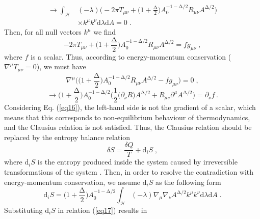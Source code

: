 \documentclass[11pt,twocolumn]{article}
\begin{document}
    \begin{align}
    \to \int_{\mathcal{H}}^{}& (-\lambda) \Bigg(-2\pi T_{\mu \nu}+\Big(1+\frac{\mathrm{\Delta}}{2}\Big) A_0^{-1-\mathrm{\Delta}/2} R_{\mu \nu} A^{\mathrm{\Delta}/2} \Bigg) \nonumber \\
    & \times k^{\mu} k^{\nu} \mathrm{d}\lambda \mathrm{d}A=0 \;. \label{eq13}
    \end{align}
    Then, for all null vectors $k^{\mu}$ we find
    \begin{equation} \label{eq14}
    -2\pi T_{\mu \nu}+\Big(1+\frac{\mathrm{\Delta}}{2}\Big) A_0^{-1-\mathrm{\Delta}/2} R_{\mu \nu} A^{\mathrm{\Delta}/2}=f g_{\mu \nu} \;,
    \end{equation}
where $f$ is a scalar. Thus, according to energy-momentum
conservation ($\nabla^{\mu} T_{\mu \nu}=0$), we must have
    \begin{equation} \label{eq15}
    \nabla^{\mu} \Bigg(\Big(1+\frac{\mathrm{\Delta}}{2}\Big) A_0^{-1-\mathrm{\Delta}/2} R_{\mu \nu} A^{\mathrm{\Delta}/2}-f g_{\mu \nu}\Bigg)=0 \;,
    \end{equation}
    \begin{equation} \label{eq16}
    \to \Big(1+\frac{\mathrm{\Delta}}{2}\Big) A_0^{-1-\mathrm{\Delta}/2} \Bigg(\frac{1}{2}\big(\partial_{\nu} R\big) A^{\mathrm{\Delta}/2} + R_{\mu \nu} \partial^{\mu} A^{\mathrm{\Delta}/2}\Bigg) =\partial_{\nu} f \,.
    \end{equation}
Considering Eq. (\ref{eq16}), the left-hand side is not the gradient of a
scalar, which means that this corresponds to non-equilibrium behaviour
of thermodynamics, and the Clausius relation is not satisfied. Thus,
the Clausius relation should be replaced by the entropy balance
relation \cite{grth3}
    \begin{equation} \label{eq17}
    \delta S=\frac{\delta Q}{T}+\mathrm{d}_i S \;,
    \end{equation}
where $\mathrm{d}_i S$ is the entropy produced inside the system
caused by irreversible transformations of the system \cite{en1}. Then, in order to resolve
the contradiction with energy-momentum conservation, we assume
$\mathrm{d}_i S$ as the following form
    \begin{equation} \label{eq18}
    \mathrm{d}_i S=\Big(1+\frac{\mathrm{\Delta}}{2}\Big) A_0^{-1-\mathrm{\Delta}/2} \int_{\mathcal{H}}^{} (-\lambda) \nabla_{\mu} \nabla_{\nu} A^{\mathrm{\Delta}/2} k^{\mu} k^{\nu} \mathrm{d}\lambda \mathrm{d}A \;.
    \end{equation}
Substituting $\mathrm{d}_i S$ in relation (\ref{eq17}) results in
\end{document}
